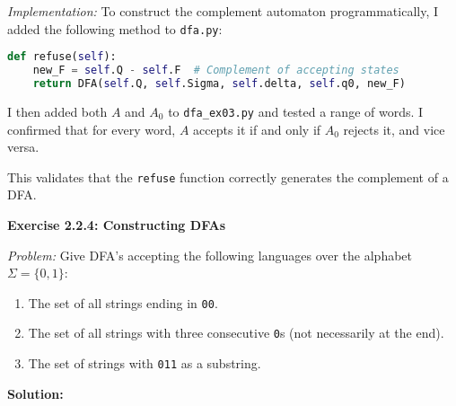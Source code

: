 \documentclass{article}
\theoremstyle{theorem}
\theoremstyle{definition}
\theoremstyle{remark}
\begin{document}
\vspace{0.5em}
\textit{Implementation:}  
To construct the complement automaton programmatically, I added the following method to \texttt{dfa.py}:

\begin{lstlisting}[language=Python]
def refuse(self):
    new_F = self.Q - self.F  # Complement of accepting states
    return DFA(self.Q, self.Sigma, self.delta, self.q0, new_F)
\end{lstlisting}

I then added both $A$ and $A_0$ to \texttt{dfa\_ex03.py} and tested a range of words. I confirmed that for every word, $A$ accepts it if and only if $A_0$ rejects it, and vice versa.

This validates that the \texttt{refuse} function correctly generates the complement of a DFA.


\textbf{Exercise 2.2.4: Constructing DFAs}

\textit{Problem:}  
Give DFA’s accepting the following languages over the alphabet $\Sigma = \{0, 1\}$:

\begin{enumerate}
  \item The set of all strings ending in \texttt{00}.
  \item The set of all strings with three consecutive \texttt{0}s (not necessarily at the end).
  \item The set of strings with \texttt{011} as a substring.
\end{enumerate}

\vspace{1em}

\textbf{Solution:}
\end{document}
